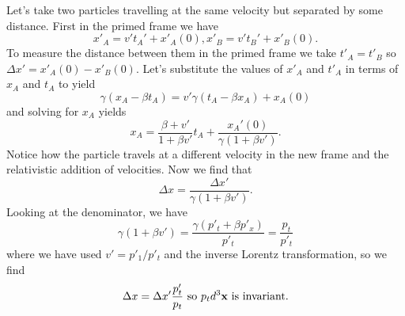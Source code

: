 Let's take two particles travelling at the same velocity but separated
by some distance. First in the primed frame we have
\begin{equation}
x'_A = v' t_A' + x'_A(0), x'_B = v' t_B' + x'_B(0).
\end{equation}
To measure the distance between them in the primed frame we take
$t'_A=t'_B$ so $\Delta x'=x'_A(0)-x'_B(0)$.  Let's substitute the
values of $x'_A$ and $t'_A$ in terms of $x_A$ and $t_A$ to yield
\begin{equation}
\gamma \left (x_A - \beta t_A \right ) = v' \gamma \left (t_A - \beta x_A\right )
+ x_A(0)
\end{equation}
and solving for $x_A$ yields
\begin{equation}
x_A = \frac{\beta + v'}{1+\beta v'} t_A + \frac{x_A'(0)}{\gamma \left (1 +
  \beta v'\right )}.
\end{equation}
Notice how the particle travels at a different velocity in the new
frame and the relativistic addition of velocities.  Now we find that
\begin{equation}
\Delta x = \frac{\Delta x'}{\gamma \left (1 +
  \beta v'\right )}. 
\end{equation}
Looking at the denominator, we have
\begin{equation}
\gamma \left ( 1 + \beta v' \right ) =  \frac{\gamma\left ( p'_t + \beta p'_x
\right ) }{p'_t} = \frac{p_t}{p'_t}
\end{equation}
where we have used $v'=p'_1/p'_t$ and the inverse Lorentz
transformation, so we find
\begin{equation}
\Delta x = \Delta x' \frac{p'_t}{p_t} 
 ~\textrm{so}~
p_t d^3 {\bf x} ~\textrm{is invariant.}
\end{equation}
